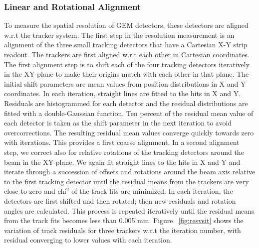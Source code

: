 \subsubsection{Linear and Rotational Alignment}
To measure the spatial resolution of GEM detectors, these detectors are aligned w.r.t the tracker system.
The first step in the resolution measurement is an alignment of the three small tracking detectors that have a Cartesian X-Y strip readout.
The trackers are first aligned w.r.t each other in Cartesian coordinates.
The first alignment step is to shift each of the four tracking detectors iteratively in the XY-plane to make their origins match with each other in that plane.
The initial shift parameters are mean values from position distributions in X and Y coordinates. In each iteration, straight lines are fitted to the hits in X and Y.
Residuals are histogrammed for each detector and the residual distributions are fitted with a double-Gaussian function.
Ten percent of the residual mean value of each detector is taken as the shift parameter in the next iteration to avoid overcorrections.
The resulting residual mean values converge quickly towards zero with iterations.
This provides a first coarse alignment.
In a second alignment step, we correct also for relative rotations of the tracking detectors around the beam in the XY-plane.
We again fit straight lines to the hits in X and Y and iterate through a succession of offsets and rotations around the beam axis relative to the first tracking detector until the residual means from the trackers are very close to zero and chi$^2$ of the track fits are minimized.
In each iteration, the detectors are first shifted and then rotated; then new residuals and rotation angles are calculated.
This process is repeated iteratively until the residual means from the track fits becomes less than 0.005 mm.
Figure.~\ref{fig:resvsit} shows the variation of track residuals for three trackers w.r.t the iteration number, with residual converging to lower values with each iteration.

